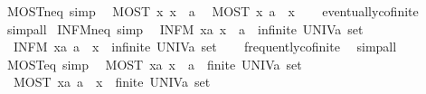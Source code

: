 \begin{isabellebody}
\endisatagproof
{\isafoldproof}%
%
\isadelimproof
\isanewline
%
\endisadelimproof
\isanewline
{}\isamarkupfalse%
\ MOST{\isacharunderscore}neq\ {\isacharbrackleft}simp{\isacharbrackright}{\isacharcolon}\isanewline
\ \ {\isachardoublequoteopen}MOST\ x{\isachardot}\ x\ {\isasymnoteq}\ a{\isachardoublequoteclose}\isanewline
\ \ {\isachardoublequoteopen}MOST\ x{\isachardot}\ a\ {\isasymnoteq}\ x{\isachardoublequoteclose}\isanewline
%
\isadelimproof
\ \ %
\endisadelimproof
%
\isatagproof
{}\isamarkupfalse%
\ eventually{\isacharunderscore}cofinite\ \isamarkupfalse%
\ simp{\isacharunderscore}all%
\endisatagproof
{\isafoldproof}%
%
\isadelimproof
\isanewline
%
\endisadelimproof
\isanewline
{}\isamarkupfalse%
\ INFM{\isacharunderscore}neq\ {\isacharbrackleft}simp{\isacharbrackright}{\isacharcolon}\isanewline
\ \ {\isachardoublequoteopen}{\isacharparenleft}INFM\ x{\isacharcolon}{\isacharcolon}{\isacharprime}a{\isachardot}\ x\ {\isasymnoteq}\ a{\isacharparenright}\ {\isasymlongleftrightarrow}\ infinite\ {\isacharparenleft}UNIV{\isacharcolon}{\isacharcolon}{\isacharprime}a\ set{\isacharparenright}{\isachardoublequoteclose}\isanewline
\ \ {\isachardoublequoteopen}{\isacharparenleft}INFM\ x{\isacharcolon}{\isacharcolon}{\isacharprime}a{\isachardot}\ a\ {\isasymnoteq}\ x{\isacharparenright}\ {\isasymlongleftrightarrow}\ infinite\ {\isacharparenleft}UNIV{\isacharcolon}{\isacharcolon}{\isacharprime}a\ set{\isacharparenright}{\isachardoublequoteclose}\isanewline
%
\isadelimproof
\ \ %
\endisadelimproof
%
\isatagproof
{}\isamarkupfalse%
\ frequently{\isacharunderscore}cofinite\ \isamarkupfalse%
\ simp{\isacharunderscore}all%
\endisatagproof
{\isafoldproof}%
%
\isadelimproof
\isanewline
%
\endisadelimproof
\isanewline
{}\isamarkupfalse%
\ MOST{\isacharunderscore}eq\ {\isacharbrackleft}simp{\isacharbrackright}{\isacharcolon}\isanewline
\ \ {\isachardoublequoteopen}{\isacharparenleft}MOST\ x{\isacharcolon}{\isacharcolon}{\isacharprime}a{\isachardot}\ x\ {\isacharequal}\ a{\isacharparenright}\ {\isasymlongleftrightarrow}\ finite\ {\isacharparenleft}UNIV{\isacharcolon}{\isacharcolon}{\isacharprime}a\ set{\isacharparenright}{\isachardoublequoteclose}\isanewline
\ \ {\isachardoublequoteopen}{\isacharparenleft}MOST\ x{\isacharcolon}{\isacharcolon}{\isacharprime}a{\isachardot}\ a\ {\isacharequal}\ x{\isacharparenright}\ {\isasymlongleftrightarrow}\ finite\ {\isacharparenleft}UNIV{\isacharcolon}{\isacharcolon}{\isacharprime}a\ set{\isacharparenright}{\isachardoublequoteclose}\isanewline

\end{isabellebody}
